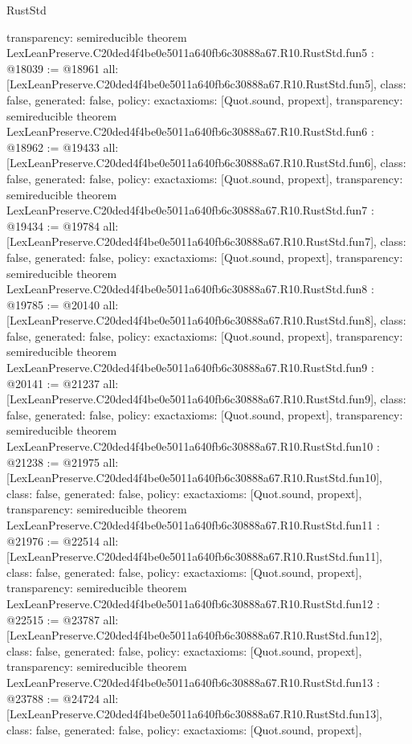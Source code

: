 \begin{lexlean}{RustStd}
\begin{coremodule}
{  transparency: semireducible
}
theorem LexLeanPreserve.C20ded4f4be0e5011a640fb6c30888a67.R10.RustStd.fun5 : @18039 := @18961 {
  all: [LexLeanPreserve.C20ded4f4be0e5011a640fb6c30888a67.R10.RustStd.fun5],
  class: false,
  generated: false,
  policy: exact{axioms: [Quot.sound, propext]},
  transparency: semireducible
}
theorem LexLeanPreserve.C20ded4f4be0e5011a640fb6c30888a67.R10.RustStd.fun6 : @18962 := @19433 {
  all: [LexLeanPreserve.C20ded4f4be0e5011a640fb6c30888a67.R10.RustStd.fun6],
  class: false,
  generated: false,
  policy: exact{axioms: [Quot.sound, propext]},
  transparency: semireducible
}
theorem LexLeanPreserve.C20ded4f4be0e5011a640fb6c30888a67.R10.RustStd.fun7 : @19434 := @19784 {
  all: [LexLeanPreserve.C20ded4f4be0e5011a640fb6c30888a67.R10.RustStd.fun7],
  class: false,
  generated: false,
  policy: exact{axioms: [Quot.sound, propext]},
  transparency: semireducible
}
theorem LexLeanPreserve.C20ded4f4be0e5011a640fb6c30888a67.R10.RustStd.fun8 : @19785 := @20140 {
  all: [LexLeanPreserve.C20ded4f4be0e5011a640fb6c30888a67.R10.RustStd.fun8],
  class: false,
  generated: false,
  policy: exact{axioms: [Quot.sound, propext]},
  transparency: semireducible
}
theorem LexLeanPreserve.C20ded4f4be0e5011a640fb6c30888a67.R10.RustStd.fun9 : @20141 := @21237 {
  all: [LexLeanPreserve.C20ded4f4be0e5011a640fb6c30888a67.R10.RustStd.fun9],
  class: false,
  generated: false,
  policy: exact{axioms: [Quot.sound, propext]},
  transparency: semireducible
}
theorem LexLeanPreserve.C20ded4f4be0e5011a640fb6c30888a67.R10.RustStd.fun10 : @21238 := @21975 {
  all: [LexLeanPreserve.C20ded4f4be0e5011a640fb6c30888a67.R10.RustStd.fun10],
  class: false,
  generated: false,
  policy: exact{axioms: [Quot.sound, propext]},
  transparency: semireducible
}
theorem LexLeanPreserve.C20ded4f4be0e5011a640fb6c30888a67.R10.RustStd.fun11 : @21976 := @22514 {
  all: [LexLeanPreserve.C20ded4f4be0e5011a640fb6c30888a67.R10.RustStd.fun11],
  class: false,
  generated: false,
  policy: exact{axioms: [Quot.sound, propext]},
  transparency: semireducible
}
theorem LexLeanPreserve.C20ded4f4be0e5011a640fb6c30888a67.R10.RustStd.fun12 : @22515 := @23787 {
  all: [LexLeanPreserve.C20ded4f4be0e5011a640fb6c30888a67.R10.RustStd.fun12],
  class: false,
  generated: false,
  policy: exact{axioms: [Quot.sound, propext]},
  transparency: semireducible
}
theorem LexLeanPreserve.C20ded4f4be0e5011a640fb6c30888a67.R10.RustStd.fun13 : @23788 := @24724 {
  all: [LexLeanPreserve.C20ded4f4be0e5011a640fb6c30888a67.R10.RustStd.fun13],
  class: false,
  generated: false,
  policy: exact{axioms: [Quot.sound, propext]},
}
\end{coremodule}
\end{lexlean}

